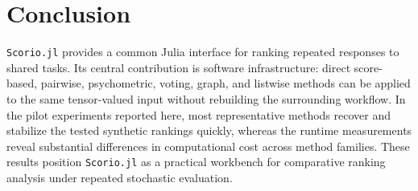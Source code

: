 \documentclass{juliacon}
\newcommand{\scorio}{\texttt{Scorio.jl}}
\begin{document}
\section{Conclusion}

\scorio{} provides a common Julia interface for ranking repeated responses to shared tasks. Its central contribution is software infrastructure: direct score-based, pairwise, psychometric, voting, graph, and listwise methods can be applied to the same tensor-valued input without rebuilding the surrounding workflow. In the pilot experiments reported here, most representative methods recover and stabilize the tested synthetic rankings quickly, whereas the runtime measurements reveal substantial differences in computational cost across method families. These results position \scorio{} as a practical workbench for comparative ranking analysis under repeated stochastic evaluation.


\balance

\end{document}
